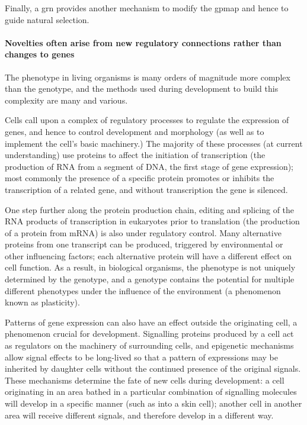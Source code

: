Finally, a \gls{grn} provides another mechanism to modify the \gls{gpmap} and hence to guide natural selection.

\paragraph{Novelties often arise from new regulatory connections rather than changes to genes}

The phenotype in living organisms is many orders of magnitude more complex than the genotype, and the methods used during development to build this complexity are many and various.

Cells call upon a complex of regulatory processes to regulate the expression of genes, and hence to control development and morphology (as well as to implement the cell's basic machinery.) The majority of these processes (at current understanding) use proteins to affect the initiation of transcription (the production of RNA from a segment of DNA, the first stage of gene expression); most commonly the presence of a specific protein promotes or inhibits the transcription of a related gene, and without transcription the gene is silenced.

One step further along the protein production chain, editing and splicing of the RNA products of transcription in eukaryotes prior to translation (the production of a protein from mRNA) is also under regulatory control. Many alternative proteins from one transcript can be produced, triggered by environmental or other influencing factors; each alternative protein will have a different effect on cell function. As a result, in biological organisms, the phenotype is not uniquely determined by the genotype, and a genotype contains the potential for multiple different phenotypes under the influence of the environment (a phenomenon known as plasticity).

Patterns of gene expression can also have an effect outside the originating cell, a phenomenon crucial for development. Signalling proteins produced by a cell act as regulators on the machinery of surrounding cells, and epigenetic mechanisms allow signal effects to be long-lived so that a pattern of expressions may be inherited by daughter cells without the continued presence of the original signals. These mechanisms determine the fate of new cells during development: a cell originating in an area bathed in a particular combination of signalling molecules will develop in a specific manner (such as into a skin cell); another cell in another area will receive different signals, and therefore develop in a different way.

